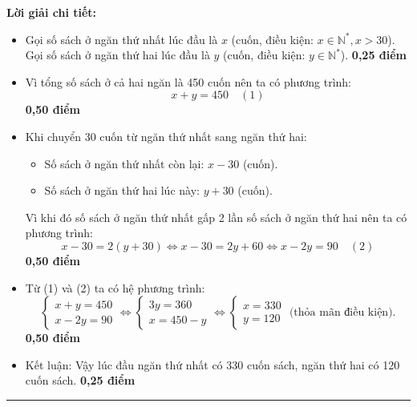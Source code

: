 \documentclass[12pt,a4paper]{article}
\begin{document}
\vspace{1.5mm}
\noindent\textbf{Lời giải chi tiết:}
\begin{itemize}[leftmargin=16pt, itemsep=2.5pt, parsep=0pt]
  \item Gọi số sách ở ngăn thứ nhất lúc đầu là $x$ (cuốn, điều kiện: $x \in \mathbb{N}^*, x > 30$).\\
  Gọi số sách ở ngăn thứ hai lúc đầu là $y$ (cuốn, điều kiện: $y \in \mathbb{N}^*$). \dotfill \textbf{0,25 điểm}
  \item Vì tổng số sách ở cả hai ngăn là 450 cuốn nên ta có phương trình:
  \[
    x + y = 450 \quad (1)
  \] \dotfill \textbf{0,50 điểm}
  \item Khi chuyển 30 cuốn từ ngăn thứ nhất sang ngăn thứ hai:
  \begin{itemize}[leftmargin=14pt, itemsep=1pt]
    \item Số sách ở ngăn thứ nhất còn lại: $x - 30$ (cuốn).
    \item Số sách ở ngăn thứ hai lúc này: $y + 30$ (cuốn).
  \end{itemize}
  Vì khi đó số sách ở ngăn thứ nhất gấp 2 lần số sách ở ngăn thứ hai nên ta có phương trình:
  \[
    x - 30 = 2(y + 30) \iff x - 30 = 2y + 60 \iff x - 2y = 90 \quad (2)
  \] \dotfill \textbf{0,50 điểm}
  \item Từ (1) và (2) ta có hệ phương trình:
  \[
    \begin{cases}
      x + y = 450 \\
      x - 2y = 90
    \end{cases}
    \iff
    \begin{cases}
      3y = 360 \\
      x = 450 - y
    \end{cases}
    \iff
    \begin{cases}
      x = 330 \\
      y = 120
    \end{cases}
    \text{ (thỏa mãn điều kiện)}.
  \] \dotfill \textbf{0,50 điểm}
  \item Kết luận: Vậy lúc đầu ngăn thứ nhất có 330 cuốn sách, ngăn thứ hai có 120 cuốn sách. \dotfill \textbf{0,25 điểm}
\end{itemize}

\vspace{2.5mm}
\hrule
\vspace{2.5mm}
\end{document}
